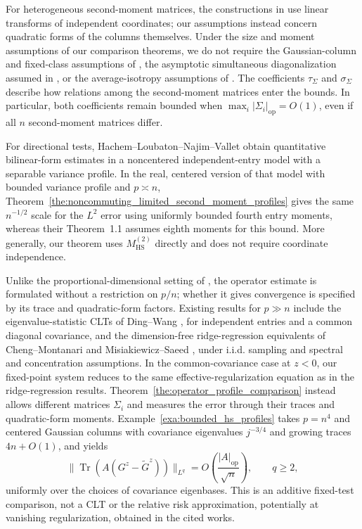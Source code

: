 \documentclass[EJP, preprint, NODS, nobera, nofontexpansion]{ejpecp}
\DeclareMathOperator{\op}{op}
\DeclareMathOperator{\tr}{Tr}
\DeclareMathOperator{\hs}{HS}
\begin{document}
For heterogeneous second-moment matrices, the constructions in
\cite{WagnerCouilletDebbahSlock2012,Yin2020DifferentCorrelations}
use linear transforms of independent coordinates; our assumptions instead
concern quadratic forms of the columns themselves. 
Under the size and moment assumptions of our comparison theorems, we do not require the Gaussian-column and fixed-class assumptions
of \cite{BenaychGeorgesCouillet2016}, the asymptotic simultaneous
diagonalization assumed in \cite{MeiWangYao2023}, or the average-isotropy
assumptions of \cite{DembczakLytova2022}. 
The coefficients \(\tau_\Sigma\) and \(\sigma_\Sigma\) describe how relations among the second-moment matrices enter the bounds.
In particular, both coefficients
remain bounded when $\max_i|\Sigma_i|_{\op}=O(1)$, even if all $n$
second-moment matrices differ.

For directional tests, Hachem--Loubaton--Najim--Vallet
\cite{HachemLoubatonNajimVallet2013} obtain quantitative bilinear-form
estimates in a noncentered independent-entry model with a separable
variance profile. In the real, centered version of that model with bounded
variance profile and $p\asymp n$,
Theorem~\ref{the:noncommuting_limited_second_moment_profiles} gives the
same $n^{-1/2}$ scale for the $L^2$ error using uniformly bounded fourth
entry moments, whereas their Theorem~1.1 assumes eighth moments for this
bound. More generally, our theorem uses $M_{\hs}^{(2)}$ directly and does
not require coordinate independence.

Unlike the proportional-dimensional setting of
\cite{HachemLoubatonNajimVallet2013}, the operator estimate is formulated
without a restriction on $p/n$; whether it gives convergence is
specified by its trace and quadratic-form factors. Existing results for
$p\gg n$ include the eigenvalue-statistic CLTs of Ding--Wang
\cite{DingWang2025}, for independent entries and a common diagonal covariance,
and the dimension-free ridge-regression equivalents of Cheng--Montanari
\cite{ChengMontanari2024} and Misiakiewicz--Saeed
\cite{MisiakiewiczSaeed2024}, under i.i.d. sampling and spectral and
concentration assumptions. In the common-covariance case at $z<0$, our
fixed-point system reduces to the same effective-regularization equation
as in the ridge-regression results.
Theorem~\ref{the:operator_profile_comparison}
instead allows different matrices $\Sigma_i$ and measures the error through
their traces and quadratic-form moments. Example~\ref{exa:bounded_hs_profiles}
takes $p=n^4$ and centered Gaussian columns with covariance eigenvalues
$j^{-3/4}$ and growing traces $4n+O(1)$, and yields
\[
    \|\tr(A(G^z-\tilde G^z))\|_{L^q}
    =O\!\left(\frac{|A|_{\op}}{\sqrt n}\right),
    \qquad q\geq2,
\]
uniformly over the choices of covariance eigenbases.
This is an additive fixed-test comparison, not a CLT or the relative
risk approximation, potentially at vanishing regularization, obtained
in the cited works.
\end{document}
